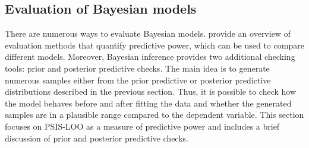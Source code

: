 \subsection{Evaluation of Bayesian models}
\label{ch:bayesian_evaluation}

There are numerous ways to evaluate Bayesian models.
\cite{piironen_comparison_2017} provide an overview of evaluation methods that quantify predictive power, which can be used to compare different models.
Moreover, Bayesian inference provides two additional checking tools: prior and posterior predictive checks.
The main idea is to generate numerous samples either from the prior predictive or posterior predictive distributions described in the previous section.
Thus, it is possible to check how the model behaves before and after fitting the data and whether the generated samples are in a plausible range compared to the dependent variable.
This section focuses on PSIS-LOO as a measure of predictive power and includes a brief discussion of prior and posterior predictive checks.

